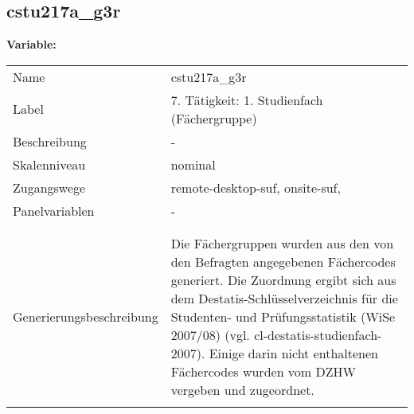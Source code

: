 	
	
	\subsection{cstu217a\_g3r}
	\label{subSection:cstu217a_g3r}

	\noindent\textbf{Variable:}\\
		\begin{tabular}{lL{11.3cm}}
			\label{tableVariable:cstu217a_g3r}
			Name & cstu217a\_g3r \\
			Label & 7. Tätigkeit: 1. Studienfach (Fächergruppe) \\
			Beschreibung & - \\
			Skalenniveau & nominal \\
			Zugangswege &
				remote-desktop-suf,
				onsite-suf,
 \\
			Panelvariablen & -
			 \\
			 \\
 \\
					Generierungsbeschreibung & Die Fächergruppen wurden aus den von den Befragten angegebenen Fächercodes generiert. Die Zuordnung ergibt sich aus dem Destatis-Schlüsselverzeichnis für die Studenten- und Prüfungsstatistik (WiSe 2007/08) (vgl. cl-destatis-studienfach-2007).  Einige darin nicht enthaltenen Fächercodes wurden vom DZHW vergeben und zugeordnet. 
				 \\	
			 \\
		\end{tabular}






